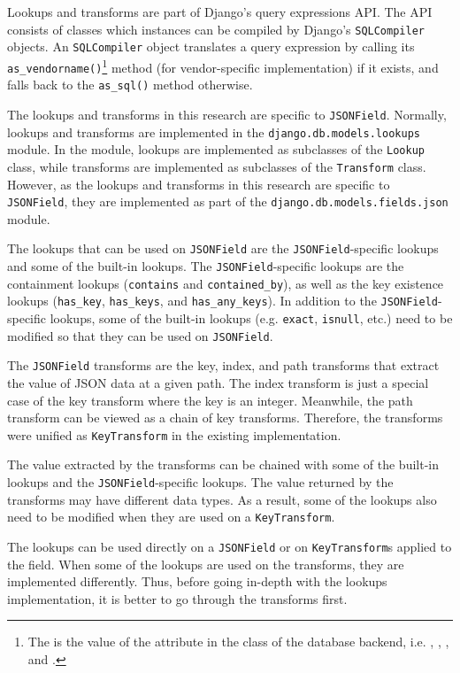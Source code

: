 Lookups and transforms are part of Django's query expressions API. The API
consists of classes which instances can be compiled by Django's
\verb|SQLCompiler| objects. An \verb|SQLCompiler| object translates a query
expression by calling its \verb|as_vendorname()|\footnote{The 
is the value of the  attribute in the  class
of the database backend, i.e. , , ,
and .} method (for vendor-specific implementation) if it exists,
and falls back to the \verb|as_sql()| method otherwise.

The lookups and transforms in this research are specific to \verb|JSONField|.
Normally, lookups and transforms are implemented in the
\verb|django.db.models.lookups| module. In the module, lookups are implemented
as subclasses of the \verb|Lookup| class, while transforms are implemented as
subclasses of the \verb|Transform| class. However, as the lookups and
transforms in this research are specific to \verb|JSONField|, they are
implemented as part of the \verb|django.db.models.fields.json| module.

The lookups that can be used on \verb|JSONField| are the
\verb|JSONField|-specific lookups and some of the built-in lookups. The
\verb|JSONField|-specific lookups are the containment lookups (\verb|contains|
and \verb|contained_by|), as well as the key existence lookups (\verb|has_key|,
\verb|has_keys|, and \verb|has_any_keys|). In addition to the
\verb|JSONField|-specific lookups, some of the built-in lookups (e.g.
\verb|exact|, \verb|isnull|, etc.) need to be modified so that they can be used
on \verb|JSONField|.

The \verb|JSONField| transforms are the key, index, and path transforms that
extract the value of JSON data at a given path. The index transform is just a
special case of the key transform where the key is an integer. Meanwhile, the
path transform can be viewed as a chain of key transforms. Therefore, the
transforms were unified as \verb|KeyTransform| in the existing implementation.

The value extracted by the transforms can be chained with some of the built-in
lookups and the \verb|JSONField|-specific lookups. The value returned by the
transforms may have different data types. As a result, some of the lookups also
need to be modified when they are used on a \verb|KeyTransform|.

The lookups can be used directly on a \verb|JSONField| or on
\verb|KeyTransform|s applied to the field. When some of the lookups are used on
the transforms, they are implemented differently. Thus, before going in-depth
with the lookups implementation, it is better to go through the transforms
first.

